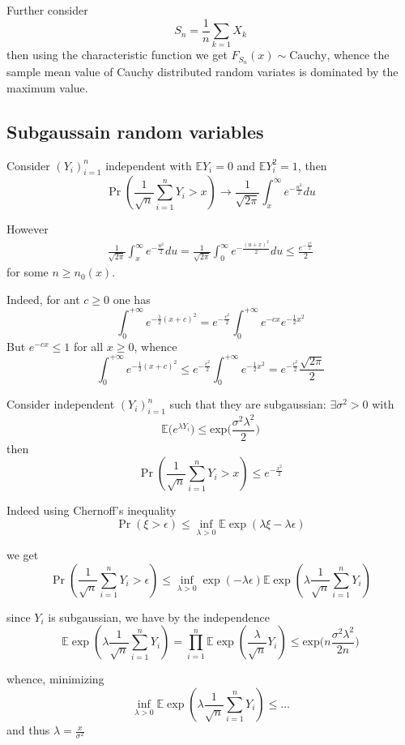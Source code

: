 \documentclass[a4paper]{article}
\newcommand{\brac}[1]{{\left ( #1 \right )}}
\newcommand{\ex}{\mathbb{E}}
\begin{document}
Further consider
\[S_n = \frac{1}{n}\sum_{k=1}X_k\]
then using the characteristic function we get $F_{S_n}(x) \sim \text{Cauchy}$, whence the sample mean value of Cauchy distributed random variates is dominated by the maximum value.

\subsection{Subgaussain random variables} %
\label{sub:subgaussain_random_variables}


Consider $\brac{Y_i}_{i=1}^n$  independent with $\ex Y_i = 0$ and $\ex Y_i^2 = 1$, then
\[\Pr\brac{ \frac{1}{\sqrt{n}}\sum_{i=1}^n Y_i > x } \to \frac{1}{\sqrt{2\pi}} \int_x^\infty e^{-\frac{u^2}{2}}du \]

However
\begin{align*}
	\frac{1}{\sqrt{2\pi}} \int_x^\infty e^{-\frac{u^2}{2}}du = \frac{1}{\sqrt{2\pi}} \int_0^\infty e^{-\frac{(u+x)^2}{2}}du \leq \frac{e^{-\frac{x^2}{2}}}{2}
\end{align*}
for some $n\geq n_0(x)$.

Indeed, for ant $c\geq 0$ one has
\[ \int_0^{+\infty} e^{-\frac{1}{2}(x+c)^2}
	= e^{-\frac{c^2}{2}} \int_0^{+\infty} e^{-cx} e^{-\frac{1}{2}x^2} \]
But $e^{-cx} \leq 1$ for all $x\geq 0$, whence
\[ \int_0^{+\infty} e^{-\frac{1}{2}(x+c)^2}
	\leq e^{-\frac{c^2}{2}} \int_0^{+\infty} e^{-\frac{1}{2}x^2}
	= e^{-\frac{c^2}{2}} \frac{\sqrt{2\pi}}{2} \]

Consider independent $\brac{Y_i}_{i=1}^n$ such that they are subgaussian: $\exists \sigma^2 > 0$ with \[\ex\big( e^{\lambda Y_i} \big) \leq \text{exp}\big( \frac{\sigma^2 \lambda^2}{2} \big)\]
then 
\[\Pr\brac{ \frac{1}{\sqrt{n}}\sum_{i=1}^n Y_i > x }\leq e^{-\frac{x^2}{2}}\]

Indeed using Chernoff's inequality
\[\Pr\brac{\xi>\epsilon}\leq \inf_{\lambda>0} \ex\exp\brac{\lambda\xi - \lambda\epsilon}\]

we get
\[\Pr\brac{\frac{1}{\sqrt{n}}\sum_{i=1}^n Y_i>\epsilon}\leq \inf_{\lambda>0} \exp\brac{ - \lambda\epsilon} \ex\exp\brac{\lambda\frac{1}{\sqrt{n}}\sum_{i=1}^n Y_i}\]

since $Y_i$ is subgaussian, we have by the independence
\[\ex\exp\brac{\lambda\frac{1}{\sqrt{n}}\sum_{i=1}^n Y_i} = 
\prod_{i=1}^n \ex\exp\brac{\frac{\lambda}{\sqrt{n}} Y_i} \leq 
\text{exp}\big( n \frac{\sigma^2 \lambda^2}{2n} \big)
\]

whence, minimizing
\[\inf_{\lambda>0} \ex\exp\brac{\lambda\frac{1}{\sqrt{n}}\sum_{i=1}^n Y_i} \leq \ldots\]
and thus $\lambda = \frac{x}{\sigma^2}$
\end{document}
